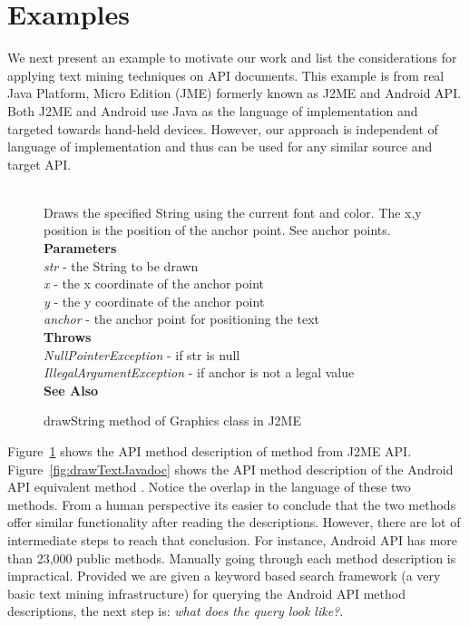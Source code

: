 \section{Examples}
\label{sec:example}

We next present an example to motivate our work and list the considerations for applying text mining techniques on API documents. 
This example is from real Java Platform, Micro Edition (JME) formerly known as J2ME and Android API. Both J2ME and Android use Java as the language of implementation and targeted towards hand-held devices. However, our approach is independent of language of implementation and thus can be used for any similar source and target API.  


\begin{figure}
	\begin{framed}
		\begin{small}
			\\
			Draws the specified String using the current font and color. The x,y position is the position of the anchor point. See anchor points.\\
			\textbf{Parameters}\\
			\textit{str} - the String to be drawn\\
			\textit{x} - the x coordinate of the anchor point\\
			\textit{y} - the y coordinate of the anchor point\\
			\textit{anchor} - the anchor point for positioning the text\\
			\textbf{Throws}\\
			\textit{NullPointerException} - if str is null\\
			\textit{IllegalArgumentException} - if anchor is not a legal value\\
			\textbf{See Also}\\
		\end{small}
	\end{framed}
	\caption{drawString method of Graphics class in J2ME}
	\label{fig:drawStringJavadoc}
\end{figure}



Figure~\ref{fig:drawStringJavadoc} shows the API method description of  method from J2ME API.
Figure~\ref{fig:drawTextJavadoc} shows the API method description of the Android API equivalent method .
Notice the overlap in the language of these two methods.
From a human perspective its easier to conclude that the two methods offer similar
functionality after reading the descriptions.
However, there are lot of intermediate steps to reach that conclusion.
For instance, Android API has more than 23,000 public methods.
Manually going through each method description is impractical.
Provided we are given a keyword based search framework (a very basic text mining infrastructure) for querying the Android API method descriptions, the next step is: \textit{what does the query look like?}.

